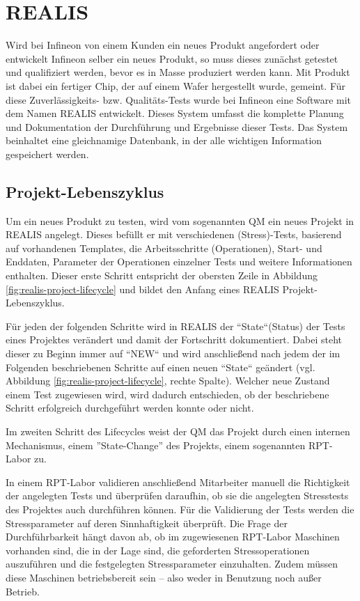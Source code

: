 \section{REALIS}\label{Sec:REALIS}
Wird bei Infineon von einem Kunden ein neues Produkt angefordert oder entwickelt Infineon selber ein neues Produkt, so muss dieses zunächst getestet und qualifiziert werden, bevor es in Masse produziert werden kann. Mit Produkt ist dabei ein fertiger Chip, der auf einem Wafer hergestellt wurde, gemeint. Für diese Zuverlässigkeits- bzw. Qualitäts-Tests wurde bei Infineon eine Software mit dem Namen \gls{REALIS} entwickelt. Dieses System umfasst die komplette Planung und Dokumentation der Durchführung und Ergebnisse dieser Tests. Das System beinhaltet eine gleichnamige Datenbank, in der alle wichtigen Information gespeichert werden.

\subsection{Projekt-Lebenszyklus}\label{Subsec:project-lifecycle}
Um ein neues Produkt zu testen, wird vom sogenannten \gls{QM} ein neues Projekt in \gls{REALIS} angelegt. Dieses befüllt er mit verschiedenen (Stress)-Tests, basierend auf vorhandenen Templates, die Arbeitsschritte (Operationen), Start- und Enddaten, Parameter der Operationen einzelner Tests und weitere Informationen enthalten. Dieser erste Schritt entspricht der obersten Zeile in Abbildung \ref{fig:realis-project-lifecycle} und bildet den Anfang eines REALIS Projekt-Lebenszyklus. 

Für jeden der folgenden Schritte wird in \gls{REALIS} der ``State``(Status) der Tests eines Projektes verändert und damit der Fortschritt dokumentiert. Dabei steht dieser zu Beginn immer auf  ``NEW`` und wird anschließend nach jedem der im Folgenden beschriebenen Schritte auf einen neuen ``State`` geändert (vgl. Abbildung \ref{fig:realis-project-lifecycle}, rechte Spalte). Welcher neue Zustand einem Test zugewiesen wird, wird dadurch entschieden, ob der beschriebene Schritt erfolgreich durchgeführt werden konnte oder nicht.

Im zweiten Schritt des Lifecycles weist der \gls{QM} das Projekt durch einen internen Mechanismus, einem ''State-Change'' des Projekts, einem sogenannten \gls{RPT}-Labor zu. 

In einem \gls{RPT}-Labor validieren anschließend Mitarbeiter manuell die Richtigkeit der angelegten Tests und überprüfen daraufhin, ob sie die angelegten Stresstests des Projektes auch durchführen können. 
Für die Validierung der Tests werden die Stressparameter auf deren Sinnhaftigkeit überprüft. Die Frage der Durchführbarkeit hängt davon ab, ob im zugewiesenen \gls{RPT}-Labor Maschinen vorhanden sind, die in der Lage sind, die geforderten Stressoperationen auszuführen und die festgelegten Stressparameter einzuhalten. Zudem müssen diese Maschinen betriebsbereit sein – also weder in Benutzung noch außer Betrieb.

